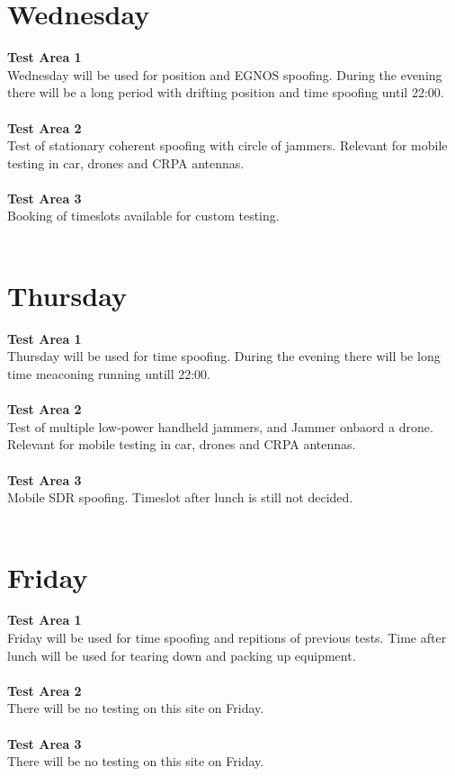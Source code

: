 \documentclass[a4paper]{book}
\begin{document}
\begin{landscape}
\chapter{Wednesday}
\Large \textbf{Test Area 1} \\
Wednesday will be used for position and EGNOS spoofing. During the evening there will be a long period with drifting position and time spoofing until 22:00. \\ \\
\Large \textbf{Test Area 2} \\
Test of stationary coherent spoofing with circle of jammers. Relevant for mobile testing in car, drones and CRPA antennas.\\ \\
\Large \textbf{Test Area 3} \\
Booking of timeslots available for custom testing.\\ \\

%

\chapter{Thursday}
\Large \textbf{Test Area 1} \\
Thursday will be used for time spoofing. During the evening there will be long time meaconing running untill 22:00.\\ \\
\Large \textbf{Test Area 2} \\
Test of multiple low-power handheld jammers, and Jammer onbaord a drone. Relevant for mobile testing in car, drones and CRPA antennas.\\ \\
\Large \textbf{Test Area 3} \\
Mobile SDR spoofing. Timeslot after lunch is still not decided.\\ \\

%

\chapter{Friday}
\Large \textbf{Test Area 1} \\
Friday will be used for time spoofing and repitions of previous tests. Time after lunch will be used for tearing down and packing up equipment.\\ \\
\Large \textbf{Test Area 2} \\
There will be no testing on this site on Friday.\\ \\
\Large \textbf{Test Area 3} \\
There will be no testing on this site on Friday.\\ \\

%

\end{landscape}
\end{document}
